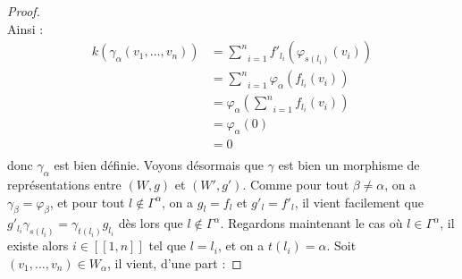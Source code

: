 \documentclass[a4paper,10pt]{article}
\begin{document}
\begin{proof}
\[	\]
Ainsi :
\[
\begin{array}{rl}
	k(\gamma_{\alpha}(v_{1},\dots,v_{n})) & = \underset{i=1}{\overset{n}{\sum}}f'_{l_{i}}(\varphi_{s(l_{i})}(v_{i})) \\ 
	& = \underset{i=1}{\overset{n}{\sum}} \varphi_{\alpha}(f_{l_{i}}(v_{i}))\\
	& = \varphi_{\alpha}(\underset{i=1}{\overset{n}{\sum}}f_{l_{i}}(v_{i}))\\
	& = \varphi_{\alpha}(0) \\
	& = 0 \\
\end{array}
\]
donc $\gamma_{\alpha}$ est bien définie. Voyons désormais que $\gamma$ est bien un morphisme de représentations entre $(W,g)$ et $(W',g')$. Comme pour tout $\beta\neq\alpha$, on a $\gamma_{\beta}=\varphi_{\beta}$, et pour tout $l\notin\Gamma^{\alpha}$, on a $g_{l}=f_{l}$ et $g'_{l}=f'_{l}$, il vient facilement que $g'_{l_{i}}\gamma_{s(l_{i})}=\gamma_{t(l_{i})}g_{l_{i}}$ dès lors que $l\notin\Gamma^{\alpha}$. Regardons maintenant le cas où $l\in\Gamma^{\alpha}$, il existe alors $i\in[\![1,n]\!]$ tel que $l=l_{i}$, et on a $t(l_{i})=\alpha$. Soit $(v_{1},\dots,v_{n})\in W_{\alpha}$, il vient, d'une part :


\end{proof}
\end{document}
